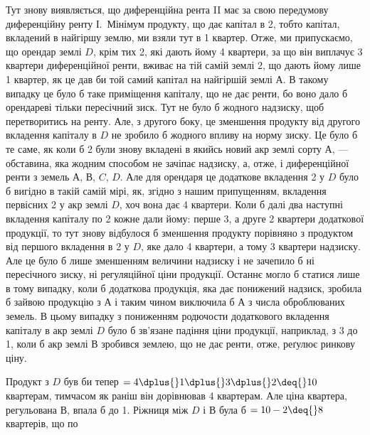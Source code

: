 Тут знову виявляється, що диференційна рента II має за свою передумову
диференційну ренту І.~Мінімум продукту, що дає капітал в 2,
тобто капітал, вкладений в найгіршу землю, ми взяли тут в 1 квартер.
Отже, ми припускаємо, що орендар землі $D$, крім тих 2, які
дають йому 4 квартери, за що він виплачує 3 квартери диференційної ренти, вживає
на тій самій землі 2, що дають йому лише 1 квартер, як це дав
би той самий капітал на
найгіршій землі $А$. В такому випадку це було б таке приміщення капіталу,
що не дає ренти, бо воно дало б орендареві тільки пересічний зиск. Тут не
було б жодного надзиску, щоб перетворитись на ренту. Але, з другого боку, це
зменшення продукту від другого вкладення капіталу в $D$ не зробило б жодного
впливу на норму зиску. Це було б те саме, як коли б 2 були
знову вкладені в якийсь новий акр землі сорту $А$, — обставина, яка жодним способом
не зачіпає надзиску, а, отже, і диференційної ренти з земель $А$, $В$, $C$, $D$.
Але для орендаря це додаткове вкладення 2 у $D$ було б вигідно
в такій самій мірі, як, згідно з нашим припущенням, вкладення первісних
2 у акр землі $D$, хоч вона дає 4 квартери. Коли б далі два наступні
вкладення капіталу по 2 кожне дали йому: перше 3, а друге
2 квартери додаткової продукції, то тут знову відбулося б зменшення продукту
порівняно з продуктом від першого вкладення в 2 у $D$, яке
дало 4 квартери, а тому 3 квартери надзиску. Але це було б лише зменшенням
величини надзиску і не зачепило б ні пересічного зиску, ні регуляційної ціни
продукції. Останнє могло б статися лише в тому випадку, коли б додаткова
продукція, яка дає понижений надзиск, зробила б зайвою продукцію з $А$ і таким
чином виключила б $А$ з числа оброблюваних земель. В цьому випадку
з пониженням родючости додаткового вкладення капіталу в акр землі $D$ було б
зв’язане падіння ціни продукції, наприклад, з 3 до 1,
коли б акр землі $В$ зробився землею, що не дає ренти, отже, реґулює ринкову ціну.

Продукт з $D$ був би тепер $= 4 \dplus{} 1 \dplus{} 3 \dplus{} 2 \deq{} 10$ квартерам, тимчасом
як раніш він дорівнював 4 квартерам. Але ціна квартера, регульована $В$, впала б
до 1. Ріжниця між $D$ і $В$ була б $= 10 - 2 \deq{} 8$ квартерів, що по
\parbreak{}  %
